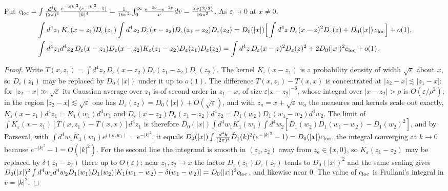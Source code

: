 \begin{lemma}
\label{lem:c20-local}
Put $c_{\rm loc}=\int\frac{d^4k}{(2\pi)^4}\frac{e^{-2|k|^2}(e^{-|k|^2}-1)}{|k|^4}=\frac{1}{16\pi^2}\int_0^\infty\frac{e^{-3v}-e^{-2v}}{v}dv=\frac{\log(2/3)}{16\pi^2}$. As $\varepsilon\to0$ at $x\ne0$,
\begin{equation}
\begin{aligned}
&\int d^4z_1\,K_\varepsilon(x-z_1)D_\varepsilon(z_1)\int d^4z_2\,D_\varepsilon(x-z_2)D_\varepsilon(z_1-z_2)D_\varepsilon(z_2)=D_0(|x|)\Big[\int d^4z\,D_\varepsilon(x-z)^2D_\varepsilon(z)+D_0(|x|)\,c_{\rm loc}\Big]+o(1),\\
&\int d^4z_1d^4z_2\,D_\varepsilon(x-z_1)D_\varepsilon(x-z_2)K_\varepsilon(z_1-z_2)D_\varepsilon(z_1)D_\varepsilon(z_2)=\int d^4z\,D_\varepsilon(x-z)^2D_\varepsilon(z)^2+2D_0(|x|)^2c_{\rm loc}+o(1).
\end{aligned}
\label{eq:c20-local}
\end{equation}
\end{lemma}

\begin{proof}
Write $T(x,z_1)=\int d^4z_2\,D_\varepsilon(x-z_2)D_\varepsilon(z_1-z_2)D_\varepsilon(z_2)$. The kernel $K_\varepsilon(x-z_1)$ is a probability density of width $\sqrt\varepsilon$ about $x$, so $D_\varepsilon(z_1)$ may be replaced by $D_0(|x|)$ under it up to $o(1)$. The difference $T(x,z_1)-T(x,x)$ is concentrated at $|z_2-x|\lesssim|z_1-x|$: for $|z_2-x|\gg\sqrt\varepsilon$ its Gaussian average over $z_1$ is of second order in $z_1-x$, of size $\varepsilon|x-z_2|^{-6}$, whose integral over $|x-z_2|>\rho$ is $O(\varepsilon/\rho^2)$; in the region $|z_2-x|\lesssim\sqrt\varepsilon$ one has $D_\varepsilon(z_2)=D_0(|x|)+O(\sqrt\varepsilon)$, and with $z_a=x+\sqrt\varepsilon\,w_a$ the measures and kernels scale out exactly, $K_\varepsilon(x-z_1)d^4z_1=K_1(w_1)d^4w_1$ and $D_\varepsilon(x-z_2)D_\varepsilon(z_1-z_2)d^4z_2=D_1(w_2)D_1(w_1-w_2)d^4w_2$. The limit of $\int K_\varepsilon(x-z_1)[T(x,z_1)-T(x,x)]d^4z_1$ is therefore $D_0(|x|)\int d^4w_1K_1(w_1)\int d^4w_2[D_1(w_2)D_1(w_1-w_2)-D_1(w_2)^2]$, and by Parseval, with $\int d^4w_1K_1(w_1)e^{i(k,w_1)}=e^{-|k|^2}$, it equals $D_0(|x|)\int\frac{d^4k}{(2\pi)^4}\hat D_1(k)^2(e^{-|k|^2}-1)=D_0(|x|)c_{\rm loc}$, the integral converging at $k\to0$ because $e^{-|k|^2}-1=O(|k|^2)$. For the second line the integrand is smooth in $(z_1,z_2)$ away from $z_a\in\{x,0\}$, so $K_\varepsilon(z_1-z_2)$ may be replaced by $\delta(z_1-z_2)$ there up to $O(\varepsilon)$; near $z_1,z_2\to x$ the factor $D_\varepsilon(z_1)D_\varepsilon(z_2)$ tends to $D_0(|x|)^2$ and the same scaling gives $D_0(|x|)^2\int d^4w_1d^4w_2D_1(w_1)D_1(w_2)[K_1(w_1-w_2)-\delta(w_1-w_2)]=D_0(|x|)^2c_{\rm loc}$, and likewise near $0$. The value of $c_{\rm loc}$ is Frullani's integral in $v=|k|^2$.
\end{proof}

